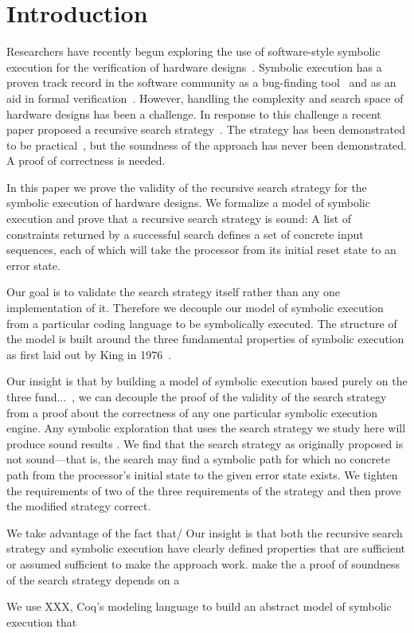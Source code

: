 \section{Introduction}
Researchers have recently begun exploring the use of software-style symbolic execution for the
verification of hardware designs~\cite{paperswecite}. Symbolic execution has a proven track record in the software community as a
bug-finding tool~\cite{} and as an aid in formal verification~\cite{}. However,
handling the complexity and search space of hardware designs has been a
challenge. In response to this challenge a recent paper proposed a recursive
search strategy~\cite{fms}. The strategy has been demonstrated to be
practical~\cite{coppelia}, but the soundness of the approach has never been
demonstrated. A proof of correctness is needed.


In this paper we prove the validity of the recursive search strategy for the
symbolic execution of hardware designs. We formalize a model of symbolic
execution and prove that a recursive search strategy is sound: A list of
constraints returned by a successful search defines a set of concrete input
sequences, each of which will take the processor from its initial reset state to
an error state.

Our goal is to validate the search strategy itself rather than any one implementation
of it. Therefore we decouple our model of symbolic execution from a particular
coding language to be symbolically executed. The structure of the model is built
around the three fundamental properties of symbolic execution as first laid out
by King in 1976~\cite{}.

Our insight is that by building a model of symbolic execution based purely on
the three fund...~\cite{}, we can decouple the proof of the validity of the
search strategy from a proof about the correctness of any one particular
symbolic execution engine. Any symbolic exploration that uses the search
strategy we study here will produce sound results .
We find that the search strategy as originally proposed is not sound---that is, the
search may find a symbolic path for which no concrete path from the processor's initial state
to the given error state exists. We tighten the requirements of two of the three
requirements of the strategy and then prove the modified strategy correct.

We take advantage of the fact that/
Our insight is that both the recursive search strategy and symbolic execution
have clearly defined properties that are sufficient or assumed sufficient to
make the approach work.  make the a proof of soundness of the search strategy depends on a 

We use XXX, Coq's modeling language to build an abstract model of symbolic execution that 



